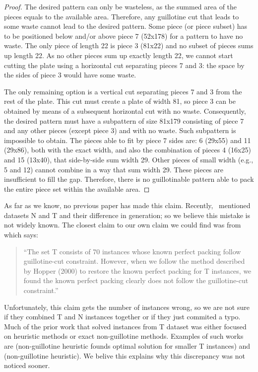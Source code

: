 \documentclass[ppgc,tese,english,formais,babel]{iiufrgs}
\begin{document}
\noindent
\begin{proof}
The desired pattern can only be wasteless, as the summed area of the pieces equals to the available area.
Therefore, any guillotine cut that leads to some waste cannot lead to the desired pattern.
Some piece (or piece subset) has to be positioned below and/or above piece 7 (52x178) for a pattern to have no waste.
The only piece of length 22 is piece 3 (81x22) and no subset of pieces sums up length 22.
As no other pieces sum up exactly length 22, we cannot start cutting the plate using a horizontal cut separating pieces 7 and 3: the space by the sides of piece 3 would have some waste.

The only remaining option is a vertical cut separating pieces 7 and 3 from the rest of the plate.
This cut must create a plate of width 81, so piece 3 can be obtained by means of a subsequent horizontal cut with no waste.
Consequently, the desired pattern must have a subpattern of size 81x179 consisting of piece 7 and any other pieces (except piece 3) and with no waste.
Such subpattern is impossible to obtain.
The pieces able to fit by piece 7 sides are: 6 (29x55) and 11 (29x86), both with the exact width, and also the combination of pieces 4 (16x25) and 15 (13x40), that side-by-side sum width 29.
Other pieces of small width (e.g., 5 and 12) cannot combine in a way that sum width 29.
These pieces are insufficient to fill the gap.
Therefore, there is no guillotinable pattern able to pack the entire piece set within the available area.

\end{proof}

As far as we know, no previous paper has made this claim.
Recently, \citet{what_matters}~mentioned datasets N and T and their difference in generation; so we believe this mistake is not widely known.
The closest claim to our own claim we could find was from~\citet{wei:2014} which says:
\begin{quote}
``The set T consists of 70 instances whose known perfect packing follow guillotine-cut constraint. However, when we follow the method described by Hopper (2000) to restore the known perfect packing for T instances, we found the known perfect packing clearly does not follow the guillotine-cut constraint.''
\end{quote}
Unfortunately, this claim gets the number of instances wrong, so we are not sure if they combined T and N instances together or if they just commited a typo.
Much of the prior work that solved instances from T dataset was either focused on heuristic methods or exact non-guillotine methods.
Examples of such works are
\citet{alvarez:2008} (non-guillotine heuristic founds optimal solution for smaller T instances) and %
\citet{wei:2011} (non-guillotine heuristic).
We belive this explains why this discrepancy was not noticed sooner.
\end{document}

